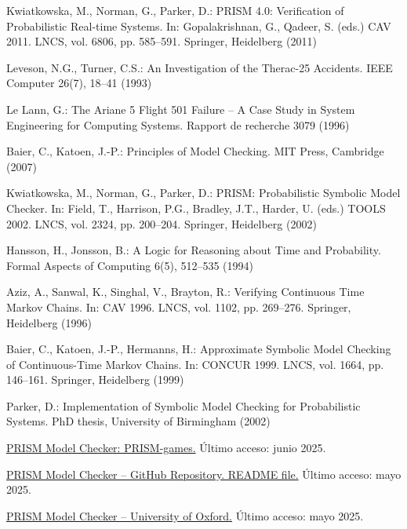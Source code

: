 \documentclass[runningheads]{llncs}
\begin{document}
\newpage

\begin{thebibliography}{21}

Kwiatkowska, M., Norman, G., Parker, D.: PRISM 4.0: Verification of Probabilistic Real-time Systems. In: Gopalakrishnan, G., Qadeer, S. (eds.) CAV 2011. LNCS, vol. 6806, pp. 585--591. Springer, Heidelberg (2011)

Leveson, N.G., Turner, C.S.: An Investigation of the Therac-25 Accidents. IEEE Computer 26(7), 18--41 (1993)

Le Lann, G.: The Ariane 5 Flight 501 Failure -- A Case Study in System Engineering for Computing Systems. Rapport de recherche 3079 (1996)

Baier, C., Katoen, J.-P.: Principles of Model Checking. MIT Press, Cambridge (2007)

Kwiatkowska, M., Norman, G., Parker, D.: PRISM: Probabilistic Symbolic Model Checker. In: Field, T., Harrison, P.G., Bradley, J.T., Harder, U. (eds.) TOOLS 2002. LNCS, vol. 2324, pp. 200--204. Springer, Heidelberg (2002)

Hansson, H., Jonsson, B.: A Logic for Reasoning about Time and Probability. Formal Aspects of Computing 6(5), 512--535 (1994)

Aziz, A., Sanwal, K., Singhal, V., Brayton, R.: Verifying Continuous Time Markov Chains. In: CAV 1996. LNCS, vol. 1102, pp. 269--276. Springer, Heidelberg (1996)

Baier, C., Katoen, J.-P., Hermanns, H.: Approximate Symbolic Model Checking of Continuous-Time Markov Chains. In: CONCUR 1999. LNCS, vol. 1664, pp. 146--161. Springer, Heidelberg (1999)

Parker, D.: Implementation of Symbolic Model Checking for Probabilistic Systems. PhD thesis, University of Birmingham (2002)

\href{https://www.prismmodelchecker.org/games/}{PRISM Model Checker: PRISM-games.} Último acceso: junio 2025.

\href{https://github.com/prismmodelchecker/prism/blob/master/README.md}{PRISM Model Checker – GitHub Repository. README file.} Último acceso: mayo 2025.

\href{https://www.cs.ox.ac.uk/activities/prism/}{PRISM Model Checker – University of Oxford.} Último acceso: mayo 2025.


\end{thebibliography}
\end{document}
